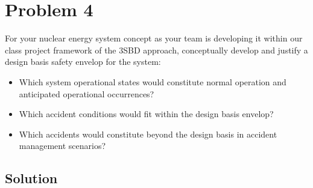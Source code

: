 \documentclass[a4paper]{article}
\begin{document}
\section*{Problem 4}
For your nuclear energy system concept as your team is developing it within our class project framework of the 3SBD approach, conceptually develop and justify a design basis safety envelop for the system:
\begin{itemize}
\item Which system operational states would constitute normal operation and anticipated operational occurrences?
\item Which accident conditions would fit within the design basis envelop?
\item Which accidents would constitute beyond the design basis in accident management scenarios?
\end{itemize}

\subsection*{Solution}
\end{document}
